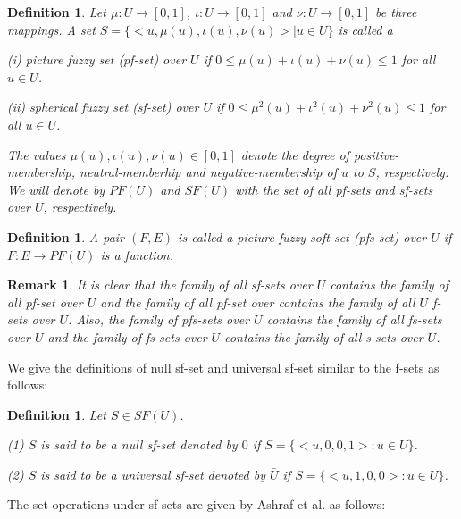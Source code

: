 \documentclass{IJFS}
\newtheorem{definition}[theorem]{Definition}
\newtheorem{remark}[theorem]{Remark}
\begin{document}
\begin{definition} \cite{as00,cuon, kut0} Let $\mu:U\to [0,1]$, $\iota:U\to [0,1]$ and $\nu:U\to [0,1]$ be three mappings. A set \linebreak[4] $S=\{<u, \mu(u), \iota(u), \nu(u)>|u\in U\}$
is called a

(i) picture fuzzy set (pf-set) over $U$ if   $0\le
\mu(u)+\iota(u)+\nu(u)\le 1$ for all $u\in U$.

(ii) spherical fuzzy set (sf-set) over $U$ if   $0\le
\mu^2(u)+\iota^2(u)+\nu^2(u)\le 1$ for all $u\in U$. 

The values
$\mu(u), \iota(u), \nu(u)\in [0,1]$ denote the degree of
positive-membership, neutral-memberhip and negative-membership of
$u$ to $S$, respectively. We will denote by $PF(U)$ and $SF(U)$ with the set
of all pf-sets and sf-sets over $U$, respectively.

\end{definition}  

\begin{definition} \cite{yang} A pair $(F, E)$ is called a picture fuzzy soft set (pfs-set) over $U$ if $F: E\to PF(U)$ is a function.

\end{definition}

\begin{remark}
It is clear that the family of all sf-sets over $U$ contains the family of all pf-set over $U$ and the family of all pf-set over contains the family of all $U$ f-sets over $U$. Also,  the family of  pfs-sets over $U$  contains the family of all fs-sets over $U$ and the family of  fs-sets over $U$  contains the family of all s-sets over $U$.
\end{remark}

We give the definitions of null sf-set and universal sf-set similar to the f-sets as follows: 
\begin{definition} Let $S\in SF(U)$.

(1) $S$ is said to be a null sf-set denoted by $\bar{0}$ if
$S=\{<u,0,0,1>:u\in U\}$.

(2) $S$ is said to be a universal sf-set denoted by $\bar{U}$ if
$S=\{<u,1,0,0>:u\in U\}$.
\end{definition}

The set operations under sf-sets are given by Ashraf et al. \cite{as00} as follows:
\end{document}
